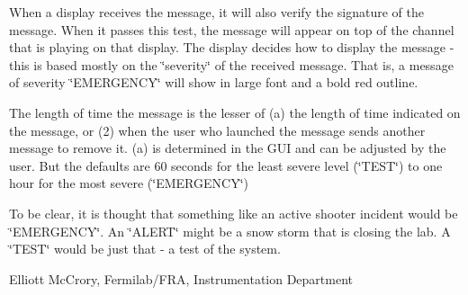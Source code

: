 When a display receives the message, it will also verify the signature of the message. When it passes this test, the message will appear on top of the channel that is playing on that display. The display decides how to display the message -\/ this is based mostly on the \char`\"{}severity\char`\"{} of the received message. That is, a message of severity \char`\"{}\-E\-M\-E\-R\-G\-E\-N\-C\-Y\char`\"{} will show in large font and a bold red outline. 

The length of time the message is the lesser of (a) the length of time indicated on the message, or (2) when the user who launched the message sends another message to remove it. (a) is determined in the G\-U\-I and can be adjusted by the user. But the defaults are 60 seconds for the least severe level (\char`\"{}\-T\-E\-S\-T\char`\"{}) to one hour for the most severe (\char`\"{}\-E\-M\-E\-R\-G\-E\-N\-C\-Y\char`\"{}) 

To be clear, it is thought that something like an active shooter incident would be \char`\"{}\-E\-M\-E\-R\-G\-E\-N\-C\-Y\char`\"{}. An \char`\"{}\-A\-L\-E\-R\-T\char`\"{} might be a snow storm that is closing the lab. A \char`\"{}\-T\-E\-S\-T\char`\"{} would be just that -\/ a test of the system. 

Elliott Mc\-Crory, Fermilab/\-F\-R\-A, Instrumentation Department 